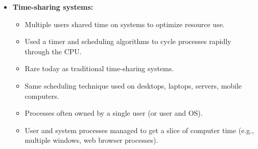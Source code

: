 \documentclass{article}
\begin{document}
\begin{itemize}
    \item \textbf{Time-sharing systems:}
    \begin{itemize}
        \item Multiple users shared time on systems to optimize resource use.
        \item Used a timer and scheduling algorithms to cycle processes rapidly through the CPU.
        \item Rare today as traditional time-sharing systems.
        \item Same scheduling technique used on desktops, laptops, servers, mobile computers.
        \item Processes often owned by a single user (or user and OS).
        \item User and system processes managed to get a slice of computer time (e.g., multiple windows, web browser processes).
    \end{itemize}
\end{itemize}
\end{document}
